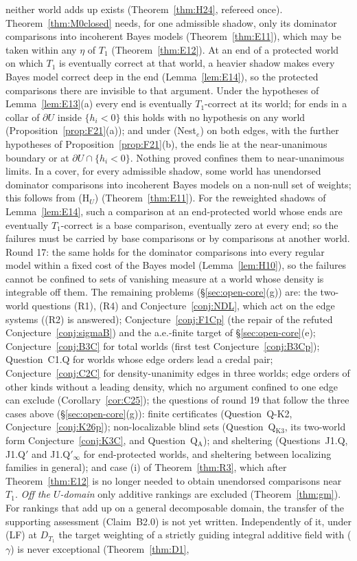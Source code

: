 \documentclass[11pt]{article}
\theoremstyle{definition}
\theoremstyle{remark}
\begin{document}
neither world adds up exists (Theorem~\ref{thm:H24}, refereed once). Theorem~\ref{thm:M0closed} needs, for one admissible shadow, only its dominator comparisons into incoherent Bayes models (Theorem~\ref{thm:E11}), which may be taken within any $\eta$ of $T_1$ (Theorem~\ref{thm:E12}). At an end of a protected world on which $T_1$ is eventually correct at that world, a heavier shadow makes every Bayes model correct deep in the end (Lemma~\ref{lem:E14}), so the protected comparisons there are invisible to that argument. Under the hypotheses of Lemma~\ref{lem:E13}(a) every end is eventually $T_1$-correct at its world; for ends in a collar of $\partial U$ inside $\{h_i<0\}$ this holds with no hypothesis on any world (Proposition~\ref{prop:F21}(a)); and under (Nest$_e$) on both edges, with the further hypotheses of Proposition~\ref{prop:F21}(b), the ends lie at the near-unanimous boundary or at $\partial U\cap\{h_i<0\}$. Nothing proved confines them to near-unanimous limits. In a cover, for every admissible shadow, some world has unendorsed dominator comparisons into incoherent Bayes models on a non-null set of weights; this follows from (H$_U$) (Theorem~\ref{thm:E11}). For the reweighted shadows of Lemma~\ref{lem:E14}, such a comparison at an end-protected world whose ends are eventually $T_1$-correct is a base comparison, eventually zero at every end; so the failures must be carried by base comparisons or by comparisons at another world. Round 17: the same holds for the dominator comparisons into every regular model within a fixed cost of the Bayes model (Lemma~\ref{lem:H10}), so the failures cannot be confined to sets of vanishing measure at a world whose density is integrable off them. The remaining problems (\S\ref{sec:open-core}(g)) are: the two-world questions (R1), (R4) and Conjecture~\ref{conj:NDL}, which act on the edge systems ((R2) is answered); Conjecture~\ref{conj:F1Cp} (the repair of the refuted Conjecture~\ref{conj:sigmaB}) and the a.e.-finite target of \S\ref{sec:open-core}(e); Conjecture~\ref{conj:B3C} for total worlds (first test Conjecture~\ref{conj:B3Cp}); Question~C1.Q for worlds whose edge orders lead a credal pair; Conjecture~\ref{conj:C2C} for density-unanimity edges in three worlds; edge orders of other kinds without a leading density, which no argument confined to one edge can exclude (Corollary~\ref{cor:C25}); the questions of round 19 that follow the three cases above (\S\ref{sec:open-core}(g)): finite certificates (Question~Q-K2, Conjecture~\ref{conj:K26p}); non-localizable blind sets (Question~Q$_{\mathrm{K3}}$, its two-world form Conjecture~\ref{conj:K3C}, and Question~Q$_{\mathrm A}$); and sheltering (Questions~J1.Q, J1.Q$'$ and J1.Q$'_\infty$ for end-protected worlds, and sheltering between localizing families in general); and case (i) of Theorem~\ref{thm:R3}, which after Theorem~\ref{thm:E12} is no longer needed to obtain unendorsed comparisons near $T_1$. \emph{Off the $U$-domain} only additive rankings are excluded (Theorem~\ref{thm:gm}). For rankings that add up on a general decomposable domain, the transfer of the supporting assessment (Claim~B2.0) is not yet written. Independently of it, under (LF) at $D_{T_1}$ the target weighting of a strictly guiding integral additive field with ($\gamma$) is never exceptional (Theorem~\ref{thm:D1}, 
\end{document}
